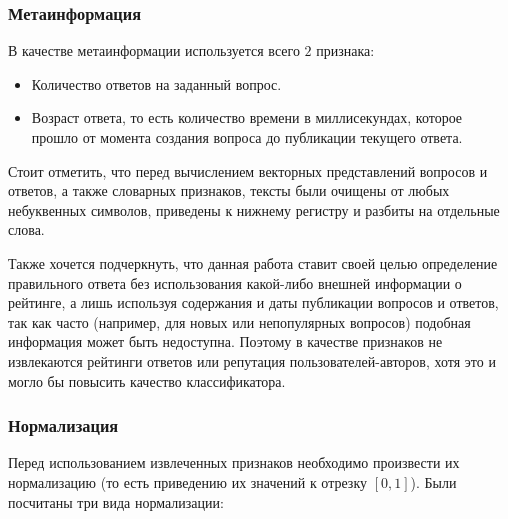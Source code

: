 \documentclass[../diploma.tex]{subfiles}
\begin{document}
	\subsubsection{Метаинформация}

   	В качестве метаинформации используется всего $2$ признака:

   	\begin{itemize}

   		\item
   		Количество ответов на заданный вопрос.

   		\item
   		Возраст ответа, то есть количество времени в миллисекундах, которое прошло от момента создания вопроса до публикации текущего ответа.

   	\end{itemize}
 
	Стоит отметить, что перед вычислением векторных представлений вопросов и ответов, а также словарных признаков, 
	тексты были очищены от любых небуквенных символов, приведены к нижнему регистру и разбиты на отдельные слова.

	Также хочется подчеркнуть, что данная работа ставит своей целью определение правильного ответа без использования какой-либо внешней информации о рейтинге, 
	а лишь используя содержания и даты публикации вопросов и ответов, 
	так как часто (например, для новых или непопулярных вопросов) подобная информация может быть недоступна.
	Поэтому в качестве признаков не извлекаются рейтинги ответов или репутация пользователей-авторов, хотя это и могло бы повысить качество классификатора.

	\subsubsection{Нормализация}
    Перед использованием извлеченных признаков необходимо произвести их нормализацию (то есть приведению их значений к отрезку $[0, 1]$).
	Были посчитаны три вида нормализации:
\end{document}
